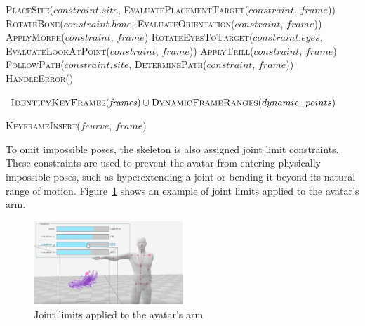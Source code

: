 \documentclass[../../main.tex]{subfiles}
\begin{document}
\begin{algorithm}
\begin{algorithmic}[1]
                \State \textsc{PlaceSite}($constraint.site$, \textsc{EvaluatePlacementTarget}($constraint$, $frame$))
                \State \textsc{RotateBone}($constraint.bone$, \textsc{EvaluateOrientation}($constraint$, $frame$))
                \State \textsc{ApplyMorph}($constraint$, $frame$)
                \State \textsc{RotateEyesToTarget}($constraint.eyes$, \textsc{EvaluateLookAtPoint}($constraint$, $frame$))
                \State \textsc{ApplyTrill}($constraint$, $frame$)
                \State \textsc{FollowPath}($constraint.site$, \textsc{DeterminePath}($constraint$, $frame$))
            \Else
                \State \textsc{HandleError}()
            \EndIf
        \EndProcedure
        
            \State \Return $\textsc{IdentifyKeyFrames}(\mathit{frames}) \cup \textsc{DynamicFrameRanges}(dynamic\_points)$
        \EndProcedure
        
                \State \textsc{KeyframeInsert}($fcurve$, $frame$)
            \EndFor
        \EndProcedure
    \end{algorithmic}
\end{algorithm}

To omit impossible poses, the skeleton is also assigned joint limit constraints. These constraints are used to prevent the avatar from entering physically impossible poses, such as hyperextending a joint or bending it beyond its natural range of motion. Figure~\ref{fig:joint_limits} shows an example of joint limits applied to the avatar's arm.

\begin{figure}
    \centering
    \includegraphics[width=0.5\textwidth]{chapters/rigging_layers/images/joint_limits.png}
    \caption{Joint limits applied to the avatar's arm}
    \label{fig:joint_limits}
\end{figure}
\end{document}
